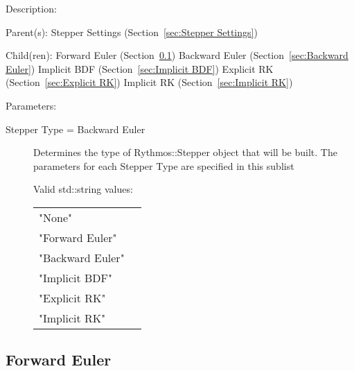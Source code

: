 \begin{list}{}
  {\setlength{\leftmargin}{1.0in}
   \setlength{\labelwidth}{0.75in}
   \setlength{\labelsep}{0.125in}}
  \item[Description:]
  \item[Parent(s):]
    Stepper Settings (Section~\ref{sec:Stepper Settings})
  \item[Child(ren):]
    Forward Euler (Section~\ref{sec:Forward Euler})
      \newline 
    Backward Euler (Section~\ref{sec:Backward Euler})
      \newline 
    Implicit BDF (Section~\ref{sec:Implicit BDF})
      \newline 
    Explicit RK (Section~\ref{sec:Explicit RK})
      \newline 
    Implicit RK (Section~\ref{sec:Implicit RK})
  \item[Parameters:]
    \begin{description}
      \item[Stepper Type = Backward Euler] 
Determines the type of Rythmos::Stepper object that will be built.
The parameters for each Stepper Type are specified in this sublist

  Valid std::string values:

      \begin{tabular}{lp{}}
      "None" & \\ 
      "Forward Euler" & \\ 
      "Backward Euler" & \\ 
      "Implicit BDF" & \\ 
      "Explicit RK" & \\ 
      "Implicit RK" & \\ 
      \end{tabular}
\end{description}

\end{list}

\subsection{Forward Euler}
\label{sec:Forward Euler}

